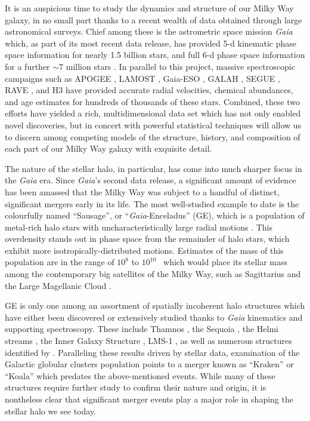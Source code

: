 It is an auspicious time to study the dynamics and structure of our Milky Way galaxy, in no small part thanks to a recent wealth of data obtained through large astronomical surveys. Chief among these is the astrometric space mission \textit{Gaia} \citep{gaia} which, as part of its most recent data release, has provided 5-d kinematic phase space information for nearly 1.5 billion stars, and full 6-d phase space information for a further $\sim7$ million stars \citep{gaiaedr3}. In parallel to this project, massive spectroscopic campaigns such as APOGEE \citep{apogee}, LAMOST \citep{lamost}, Gaia-ESO \citep{gaiaeso}, GALAH \citep{galah}, SEGUE \citep{segue}, RAVE \citep[][for the most recent data release]{ravedr16}, and H3 \citep{h3} have provided accurate radial velocities, chemical abundances, and age estimates for hundreds of thousands of these stars. Combined, these two efforts have yielded a rich, multidimensional data set which has not only enabled novel discoveries, but in concert with powerful statistical techniques will allow us to discern among competing models of the structure, history, and composition of each part of our Milky Way galaxy with exquisite detail. 

The nature of the stellar halo, in particular, has come into much sharper focus in the \textit{Gaia} era. Since \textit{Gaia}'s second data release,  a significant amount of evidence has been amassed that the Milky Way was subject to a handful of distinct, significant mergers early in its life. The most well-studied example to date is the colourfully named ``Sausage'', or ``\textit{Gaia}-Enceladus'' (GE), which is a population of metal-rich halo stars with uncharacteristically large radial motions \citep{helmi18,belokurov18,haywood18}. This overdensity stands out in phase space from the remainder of halo stars, which exhibit more isotropically-distributed motions. Estimates of the mass of this population are in the range of $10^{8}$ to $10^{10}$~\Msun \citep{belokurov18,helmi18,fattahi19,deason19,mackereth19a,mackereth20,kruijssen20,naidu21} which would place its stellar mass among the contemporary big satellites of the Milky Way, such as Sagittarius and the Large Magellanic Cloud \citep[e.g.][]{niederste-ostholt10,vandermarel06}.

GE is only one among an assortment of spatially incoherent halo structures which have either been discovered or extensively studied thanks to \textit{Gaia} kinematics and supporting spectroscopy. These include Thamnos \citep{koppelman19b}, the Sequoia \citep{myeong19}, the Helmi streams \citep{helmi99,koppelman18,koppelman19a}, the Inner Galaxy Structure \citep[IGS, also known as Heracles;][]{horta21}, LMS-1 \citep{yuan20}, as well as numerous structures identified by \citet{naidu20}. Paralleling these results driven by stellar data, examination of the Galactic globular clusters population points to a merger known as ``Kraken'' \citep{kruijssen20} or ``Koala'' \citep{forbes20} which predates the above-mentioned events. While many of these structures require further study to confirm their nature and origin, it is nontheless clear that significant merger events play a major role in shaping the stellar halo we see today.

